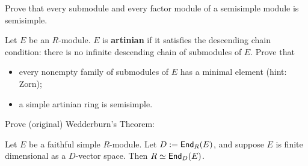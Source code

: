 \begin{ex} 
\label{factor} Prove that every submodule and every factor module of a semisimple module is semisimple. 
\end{ex}

\begin{ex}
\label{artinian}
Let $E$ be an $R$-module. $E$ is \textbf{artinian} if it satisfies the descending chain condition: there is no infinite descending chain of submodules of $E$. 
Prove that
\begin{itemize}
    \item every nonempty family of submodules of $E$ has a minimal element (hint: Zorn);
    \item a simple artinian ring is semisimple.
\end{itemize} 
\end{ex}

\begin{ex}
\label{wedderburn} 
Prove (original) Wedderburn's Theorem: 

Let $E$ be a faithful simple $R$-module. Let $D:=\operatorname{\sf{End}}_R(E)$, and suppose $E$ is finite dimensional as a $D$-vector space. Then $R\simeq \operatorname{\sf{End}}_D(E)$. 
\end{ex}
